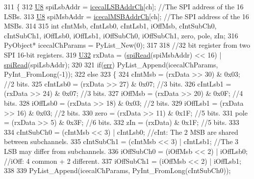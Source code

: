 \begin{DoxyCode}
311 \{                            
312     \hyperlink{ICECALv3_8h_a3cb25ca6f51f003950f9625ff05536fc}{U8} spiLsbAddr = \hyperlink{ICECALv3_8h_abd124f50fa794b9b0aded801fabf5322}{icecalLSBAddrCh}[ch];           \textcolor{comment}{//The SPI address of the 16 LSBs.}
313     \hyperlink{ICECALv3_8h_a3cb25ca6f51f003950f9625ff05536fc}{U8} spiMsbAddr = \hyperlink{ICECALv3_8h_afba64a649cc9314882fd49b62b99d6e7}{icecalMSBAddrCh}[ch];           \textcolor{comment}{//The SPI address of the 16 MSBs.}
314 
315     \textcolor{keywordtype}{int} cIntMsb, cIntLsb0, cIntLsb1, iOffMsb, cIntSubCh0, cIntSubCh1, iOffLsb0, iOffLsb1, iOffSubCh0, 
      iOffSubCh1, zero, pole, zIn;
316     PyObject* icecalChParams = PyList\_New(0);
317 
318     \textcolor{comment}{//32 bit register from two SPI 16-bit registers.}
319     \hyperlink{ICECALv3_8h_a811024d35b9b8a41095b1f583b649e56}{U32} rxData = (\hyperlink{classICECALv3_aaabb9543482c4141fa89b4b8410164e0}{spiRead}(spiMsbAddr) << 16) | \hyperlink{classICECALv3_aaabb9543482c4141fa89b4b8410164e0}{spiRead}(spiLsbAddr);
320 
321     \textcolor{keywordflow}{if}(\hyperlink{classICECALv3_ad8989925ee5b3ff322d863ce6aaff0bd}{err}) PyList\_Append(icecalChParams, PyInt\_FromLong(-1));
322     \textcolor{keywordflow}{else}
323     \{
324         cIntMsb     = (rxData >> 30) & 0x03;        \textcolor{comment}{//2 bits.}
325         cIntLsb0    = (rxData >> 27) & 0x07;        \textcolor{comment}{//3 bits.}
326         cIntLsb1    = (rxData >> 24) & 0x07;        \textcolor{comment}{//3 bits.}
327         iOffMsb     = (rxData >> 20) & 0x0F;        \textcolor{comment}{//4 bits.}
328         iOffLsb0    = (rxData >> 18) & 0x03;        \textcolor{comment}{//2 bits.}
329         iOffLsb1    = (rxData >> 16) & 0x03;        \textcolor{comment}{//2 bits.}
330         zero            = (rxData >> 11) & 0x1F;        \textcolor{comment}{//5 bits.}
331         pole            = (rxData >> 5)  & 0x3F;        \textcolor{comment}{//6 bits.}
332         zIn             = (rxData)           & 0x1F;        \textcolor{comment}{//5 bits.}
333 
334         cIntSubCh0 = (cIntMsb << 3) | cIntLsb0;     \textcolor{comment}{//cInt: The 2 MSB are shared between subchannels.}
335         cIntSubCh1 = (cIntMsb << 3) | cIntLsb1;     \textcolor{comment}{//The 3 LSB may differ from subchannels.}
336         iOffSubCh0 = (iOffMsb << 2) | iOffLsb0;     \textcolor{comment}{//iOff: 4 common + 2 different.}
337         iOffSubCh1 = (iOffMsb << 2) | iOffLsb1;
338 
339         PyList\_Append(icecalChParams, PyInt\_FromLong(cIntSubCh0));

\end{DoxyCode}
